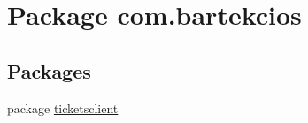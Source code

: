\hypertarget{namespacecom_1_1bartekcios}{}\section{Package com.\+bartekcios}
\label{namespacecom_1_1bartekcios}
\subsection*{Packages}
\begin{DoxyCompactItemize}
\item 
package \hyperlink{namespacecom_1_1bartekcios_1_1ticketsclient}{ticketsclient}
\end{DoxyCompactItemize}
